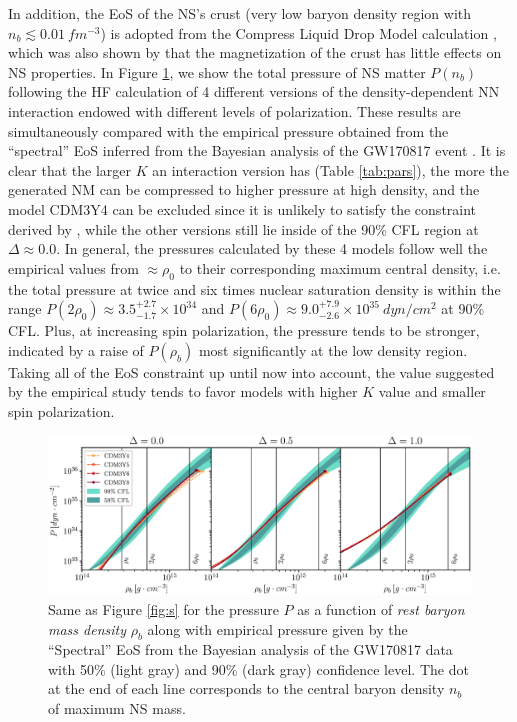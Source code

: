 In addition, the \gls{EoS} of the \gls{NS}'s crust (very low baryon density region with $n_b \lesssim 0.01\:fm^{-3}$) is adopted from the Compress Liquid Drop Model calculation \citep{douchin2000nuclear,douchin2001unified}, which was also shown by \cite{tan2020spin} that the magnetization of the crust has little effects on \gls{NS} properties. In Figure \ref{fig:p}, we show the total pressure of \gls{NS} matter $P(n_b)$ following the \gls{HF} calculation of 4 different versions of the density-dependent \gls{NN} interaction endowed with different levels of polarization. These results are simultaneously compared with the empirical pressure obtained from the ``spectral'' \gls{EoS} inferred from the Bayesian analysis of the GW170817 event \citep{abbott2018gw170817}. It is clear that the larger $K$ an interaction version has (Table \ref{tab:pars}), the more the generated \gls{NM} can be compressed to higher pressure at high density, and the model CDM3Y4 can be excluded since it is unlikely to satisfy the constraint derived by \cite{abbott2018gw170817}, while the other versions still lie inside of the 90\% \gls{CFL} region at $\Delta\approx 0.0$. In general, the pressures calculated by these 4 models follow well the empirical values from $\approx \rho_0$ to their corresponding maximum central density, i.e. the total pressure at twice and six times nuclear saturation density is within the range $P(2\rho_0)\approx 3.5^{+2.7}_{-1.7}\times 10^{34}$ and $P(6\rho_0)\approx 9.0^{+7.9}_{-2.6}\times 10^{35}\:dyn/cm^2$ at 90\% \gls{CFL}. Plus, at increasing spin polarization, the pressure tends to be stronger, indicated by a raise of $P(\rho_b)$ most significantly at the low density region. Taking all of the \gls{EoS} constraint up until now into account, the value suggested by the empirical study tends to favor models with higher $K$ value and smaller spin polarization.
\begin{figure}[ht!]
        \centering
        \includegraphics[width=\textwidth]{fig/P.eps}
        \caption{Same as Figure \ref{fig:s} for the pressure $P$ as a function of \emph{rest baryon mass density} $\rho_b$ along with empirical pressure given by the ``Spectral'' \gls{EoS} from the Bayesian analysis of the GW170817 data \citep{abbott2018gw170817} with 50\% (light gray) and 90\% (dark gray) confidence level. The dot at the end of each line corresponds to the central baryon density $n_b$ of maximum \gls{NS} mass.}
        \label{fig:p}
\end{figure} 
